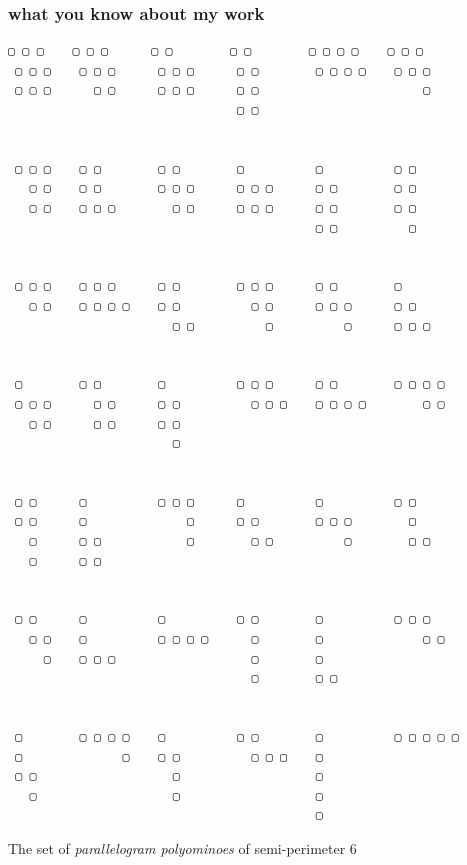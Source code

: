 \documentclass[9pt]{beamer}
\begin{document}
\begin{frame}[fragile]
\frametitle{what you know about my work}
\begin{Verbatim}[baselinestretch=0.5, fontsize=\footnotesize]
 ▢ ▢ ▢    ▢ ▢ ▢      ▢ ▢        ▢ ▢        ▢ ▢ ▢ ▢    ▢ ▢ ▢
 ▢ ▢ ▢    ▢ ▢ ▢      ▢ ▢ ▢      ▢ ▢        ▢ ▢ ▢ ▢    ▢ ▢ ▢
 ▢ ▢ ▢      ▢ ▢      ▢ ▢ ▢      ▢ ▢                       ▢
                                ▢ ▢


 ▢ ▢ ▢    ▢ ▢        ▢ ▢        ▢          ▢          ▢ ▢
   ▢ ▢    ▢ ▢        ▢ ▢ ▢      ▢ ▢ ▢      ▢ ▢        ▢ ▢
   ▢ ▢    ▢ ▢ ▢        ▢ ▢      ▢ ▢ ▢      ▢ ▢        ▢ ▢
                                           ▢ ▢          ▢


 ▢ ▢ ▢    ▢ ▢ ▢      ▢ ▢        ▢ ▢ ▢      ▢ ▢        ▢
   ▢ ▢    ▢ ▢ ▢ ▢    ▢ ▢          ▢ ▢      ▢ ▢ ▢      ▢ ▢
                       ▢ ▢          ▢          ▢      ▢ ▢ ▢


 ▢        ▢ ▢        ▢          ▢ ▢ ▢      ▢ ▢        ▢ ▢ ▢ ▢
 ▢ ▢ ▢      ▢ ▢      ▢ ▢          ▢ ▢ ▢    ▢ ▢ ▢ ▢        ▢ ▢
   ▢ ▢      ▢ ▢      ▢ ▢
                       ▢


 ▢ ▢      ▢          ▢ ▢ ▢      ▢          ▢          ▢ ▢
 ▢ ▢      ▢              ▢      ▢ ▢        ▢ ▢ ▢        ▢
   ▢      ▢ ▢            ▢        ▢ ▢          ▢        ▢ ▢
   ▢      ▢ ▢


 ▢ ▢      ▢          ▢          ▢ ▢        ▢          ▢ ▢ ▢
   ▢ ▢    ▢          ▢ ▢ ▢ ▢      ▢        ▢              ▢ ▢
     ▢    ▢ ▢ ▢                   ▢        ▢
                                  ▢        ▢ ▢


 ▢        ▢ ▢ ▢ ▢    ▢          ▢ ▢        ▢          ▢ ▢ ▢ ▢ ▢
 ▢              ▢    ▢ ▢          ▢ ▢ ▢    ▢
 ▢ ▢                   ▢                   ▢
   ▢                   ▢                   ▢
                                           ▢
\end{Verbatim}
The set of \textit{parallelogram polyominoes} of semi-perimeter $6$
\end{frame}
\end{document}
